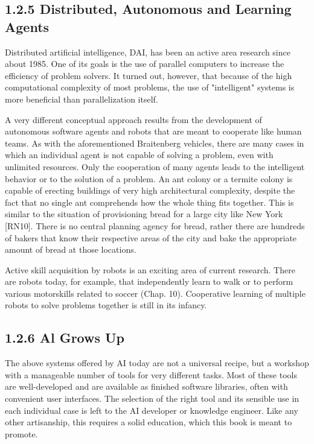 \documentclass[10pt]{article}
\begin{document}
\subsection*{1.2.5 Distributed, Autonomous and Learning Agents}
Distributed artificial intelligence, DAI, has been an active area research since about 1985. One of its goals is the use of parallel computers to increase the efficiency of problem solvers. It turned out, however, that because of the high computational complexity of most problems, the use of "intelligent" systems is more beneficial than parallelization itself.

A very different conceptual approach results from the development of autonomous software agents and robots that are meant to cooperate like human teams. As with the aforementioned Braitenberg vehicles, there are many cases in which an individual agent is not capable of solving a problem, even with unlimited resources. Only the cooperation of many agents leads to the intelligent behavior or to the solution of a problem. An ant colony or a termite colony is capable of erecting buildings of very high architectural complexity, despite the fact that no single ant comprehends how the whole thing fits together. This is similar to the situation of provisioning bread for a large city like New York [RN10]. There is no central planning agency for bread, rather there are hundreds of bakers that know their respective areas of the city and bake the appropriate amount of bread at those locations.

Active skill acquisition by robots is an exciting area of current research. There are robots today, for example, that independently learn to walk or to perform\\
various motorskills related to soccer (Chap. 10). Cooperative learning of multiple robots to solve problems together is still in its infancy.


\subsection*{1.2.6 Al Grows Up}
The above systems offered by AI today are not a universal recipe, but a workshop with a manageable number of tools for very different tasks. Most of these tools are well-developed and are available as finished software libraries, often with convenient user interfaces. The selection of the right tool and its sensible use in each individual case is left to the AI developer or knowledge engineer. Like any other artisanship, this requires a solid education, which this book is meant to promote.
\end{document}
